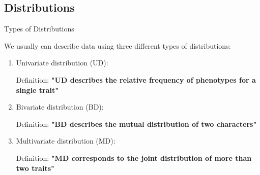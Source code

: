 \documentclass{beamer}
\begin{document}

\subsection{Distributions}
\begin{frame}{Types of Distributions}
 
  We usually can describe data using three different types of distributions:

  \begin{enumerate}
    
  \item<1->  Univariate distribution (UD):
  
  Definition: \textbf{"UD describes the relative frequency of phenotypes for a single trait"} 
  \vspace{0.2cm}
 
  \item<2->  Bivariate distribution (BD):
  
  Definition: \textbf{"BD describes the mutual distribution of two characters"}
  \vspace{0.2cm}
  
  \item<3->  Multivariate distribution (MD):
  
  Definition: \textbf{"MD corresponds to the joint distribution of more than two traits"}
  \vspace{0.2cm}
  
  \end{enumerate} 
\end{frame}

\end{document}
